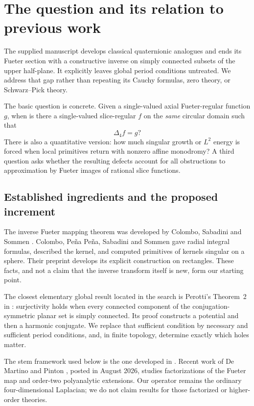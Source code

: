 \documentclass[11pt,a4paper]{article}
\numberwithin{equation}{section}
\theoremstyle{definition}
\theoremstyle{remark}
\newcommand{\lap}{\Delta_4}
\begin{document}
\section{The question and its relation to previous work}
\label{sec:intro}
The supplied manuscript \cite{Attachment} develops classical quaternionic
analogues and ends its Fueter section with a constructive inverse on simply
connected subsets of the upper half-plane. It explicitly leaves global
period conditions untreated. We address that gap rather than repeating its
Cauchy formulas, zero theory, or Schwarz--Pick theory.

The basic question is concrete. Given a single-valued axial Fueter-regular
function $g$, when is there a single-valued slice-regular $f$ on the
\emph{same} circular domain such that
\begin{equation}
 \lap f=g?
 \label{eq:problem}
\end{equation}
There is also a quantitative version: how much singular growth or $L^2$
energy is forced when local primitives return with nonzero affine monodromy?
A third question asks whether the resulting defects account for all
obstructions to approximation by Fueter images of rational slice functions.

\subsection{Established ingredients and the proposed increment}
The inverse Fueter mapping theorem was developed by Colombo, Sabadini and
Sommen \cite{CSS11,CSS13}. Colombo, Pe\~na Pe\~na, Sabadini and Sommen
\cite{CPSS14} gave radial integral formulas, described the kernel, and
computed primitives of kernels singular on a sphere. Their preprint develops
its explicit construction on rectangles. These facts, and not a claim that
the inverse transform itself is new, form our starting point.

The closest elementary global result located in the search is Perotti's
Theorem~2 in \cite{Perotti24}: surjectivity holds when every connected
component of the conjugation-symmetric planar set is simply connected. Its
proof constructs a potential and then a harmonic conjugate. We replace
that sufficient condition by necessary and sufficient period conditions,
and, in finite topology, determine exactly which holes matter.

The stem framework used below is the one developed in \cite{GP11}.
Recent work of De Martino and Pinton \cite{DMP26}, posted in August 2026,
studies factorizations of the Fueter map and order-two polyanalytic
extensions. Our operator remains the ordinary four-dimensional Laplacian;
we do not claim results for those factorized or higher-order theories.
\end{document}
